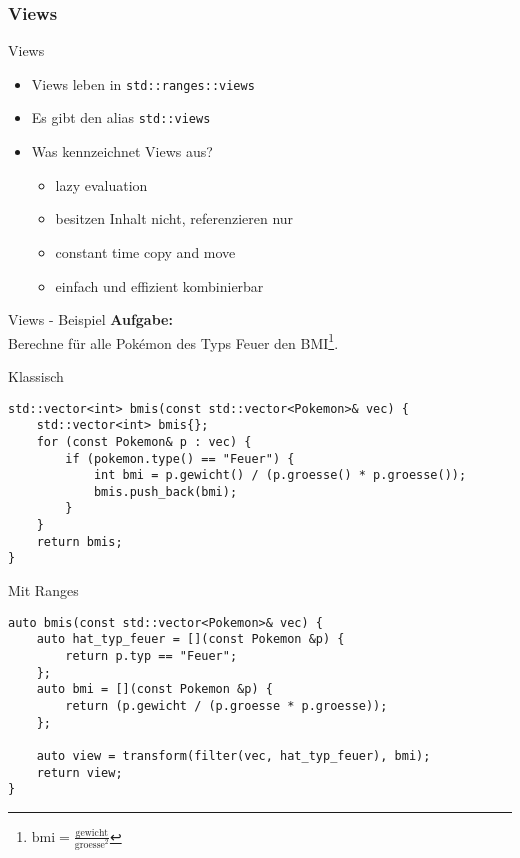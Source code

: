 \subsubsection{Views}

\begin{frame}{Views}
	\begin{itemize}
        \item<1-> Views leben in \texttt{std::ranges::views}
        \item<2-> Es gibt den alias \texttt{std::views}
		\item<3-> Was kennzeichnet Views aus?
		\begin{itemize}
            \item<4-> lazy evaluation
            \item<5-> besitzen Inhalt nicht, referenzieren nur
            \item<6-> constant time copy and move
            \item<7-> einfach und effizient kombinierbar
        \end{itemize}
	\end{itemize}
\end{frame}



\begin{frame}{Views - Beispiel}
	\textbf{Aufgabe:}\\
	Berechne für alle Pokémon des Typs Feuer den BMI\footnote{$\text{bmi} = \frac{\text{gewicht}}{\text{groesse}^2}$}.
\end{frame}

\begin{frame}[fragile]{Klassisch}
	\begin{verbatim}
std::vector<int> bmis(const std::vector<Pokemon>& vec) {
    std::vector<int> bmis{};
    for (const Pokemon& p : vec) {
        if (pokemon.type() == "Feuer") {
            int bmi = p.gewicht() / (p.groesse() * p.groesse());
            bmis.push_back(bmi);
        }
    }
    return bmis;
}
\end{verbatim}
\end{frame}


\begin{frame}[fragile]{Mit Ranges}
	\begin{verbatim}
auto bmis(const std::vector<Pokemon>& vec) {
    auto hat_typ_feuer = [](const Pokemon &p) {
        return p.typ == "Feuer";
    };
    auto bmi = [](const Pokemon &p) {
        return (p.gewicht / (p.groesse * p.groesse));
    };
    
    auto view = transform(filter(vec, hat_typ_feuer), bmi);
    return view;
}
\end{verbatim}
\end{frame}

